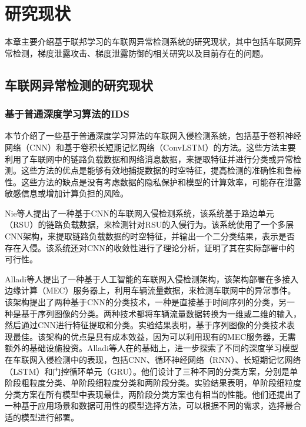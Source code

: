 \setlength{\baselineskip}{20pt}
\chapter{研究现状}
\label{cha:chap2}

本章主要介绍基于联邦学习的车联网异常检测系统的研究现状，其中包括车联网异常检测，梯度泄露攻击、梯度泄露防御的相关研究以及目前存在的问题。

\section{车联网异常检测的研究现状}

\subsection{基于普通深度学习算法的IDS}

本节介绍了一些基于普通深度学习算法的车联网入侵检测系统，包括基于卷积神经网络（CNN）和基于卷积长短期记忆网络（ConvLSTM）的方法。这些方法主要利用了车联网中的链路负载数据和网络消息数据，来提取特征并进行分类或异常检测。这些方法的优点是能够有效地捕捉数据的时空特征，提高检测的准确性和鲁棒性。这些方法的缺点是没有考虑数据的隐私保护和模型的计算效率，可能存在泄露敏感信息或增加计算负担的风险。

Nie等人\cite{Date_Driven}提出了一种基于CNN的车联网入侵检测系统，该系统基于路边单元（RSU）的链路负载数据，来检测针对RSU的入侵行为。该系统使用了一个多层CNN架构，来提取链路负载数据的时空特征，并输出一个二分类结果，表示是否存在入侵。该系统还对CNN的收敛性进行了理论分析，证明了其在实际部署中的可行性。

Alladi等人\cite{ref13}提出了一种基于人工智能的车联网入侵检测架构，该架构部署在多接入边缘计算（MEC）服务器上，利用车辆流量数据，来检测车联网中的异常事件。该架构提出了两种基于CNN的分类技术，一种是直接基于时间序列的分类，另一种是基于序列图像的分类。两种技术都将车辆流量数据转换为一维或二维的输入，然后通过CNN进行特征提取和分类。实验结果表明，基于序列图像的分类技术表现最佳。该架构的优点是具有成本效益，因为可以利用现有的MEC服务器，无需额外的基础设施投资。Alladi等人\cite{ref14}在\cite{ref13}的基础上，进一步探索了不同的深度学习模型在车联网入侵检测中的表现，包括CNN、循环神经网络（RNN）、长短期记忆网络（LSTM）和门控循环单元（GRU）。他们设计了三种不同的分类方案，分别是单阶段粗粒度分类、单阶段细粒度分类和两阶段分类。实验结果表明，单阶段细粒度分类方案在所有模型中表现最佳，两阶段分类方案也有相当的性能。他们还提出了一种基于应用场景和数据可用性的模型选择方法，可以根据不同的需求，选择最合适的模型进行部署。

